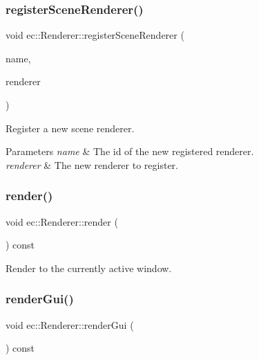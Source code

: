\mbox{\label{classec_1_1_renderer_a5e40791070a8fcb7250b4544bdac8725}} 
\subsubsection{\texorpdfstring{register\+Scene\+Renderer()}{registerSceneRenderer()}}
{\footnotesize\ttfamily void ec\+::\+Renderer\+::register\+Scene\+Renderer (\begin{DoxyParamCaption}\item[{const std\+::string \&}]{name,  }\item[{\mbox{\hyperlink{classec_1_1_scene_renderer}{Scene\+Renderer}} $\ast$}]{renderer }\end{DoxyParamCaption})}



Register a new scene renderer. 


\begin{DoxyParams}{Parameters}
{\em name} & The id of the new registered renderer. \\
\hline
{\em renderer} & The new renderer to register. \\
\hline
\end{DoxyParams}
\mbox{\label{classec_1_1_renderer_a7ff2c9444ad5da2a6db3331f19cb12f9}} 
\subsubsection{\texorpdfstring{render()}{render()}}
{\footnotesize\ttfamily void ec\+::\+Renderer\+::render (\begin{DoxyParamCaption}{ }\end{DoxyParamCaption}) const}



Render to the currently active window. 

\mbox{\label{classec_1_1_renderer_a7dcfbdfd04d48452aba34a591b48341f}} 
\subsubsection{\texorpdfstring{render\+Gui()}{renderGui()}}
{\footnotesize\ttfamily void ec\+::\+Renderer\+::render\+Gui (\begin{DoxyParamCaption}{ }\end{DoxyParamCaption}) const\hspace{0.3cm}{\ttfamily [protected]}}



